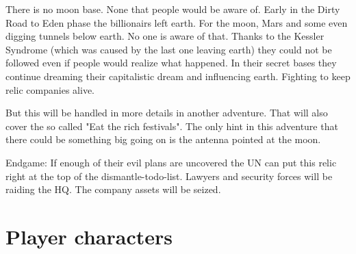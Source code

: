 \begin{sidebarBox}[title=Moon base]

    There is no moon base. None that people would be aware of. Early in the Dirty Road to Eden phase the billionairs left earth. For the moon, Mars and some even digging tunnels below earth. No one is aware of that. Thanks to the Kessler Syndrome (which was caused by the last one leaving earth) they could not be followed even if people would realize what happened.
    In their secret bases they continue dreaming their capitalistic dream and influencing earth. Fighting to keep relic companies alive.

    But this will be handled in more details in another adventure. That will also cover the so called "Eat the rich festivals". The only hint in this adventure that there could be something big going on is the antenna pointed at the moon.
\end{sidebarBox}

Endgame: If enough of their evil plans are uncovered the UN can put this relic right at the top of the dismantle-todo-list. Lawyers and security forces will be raiding the HQ. The company assets will be seized.


\section{Player characters}

\newpage

